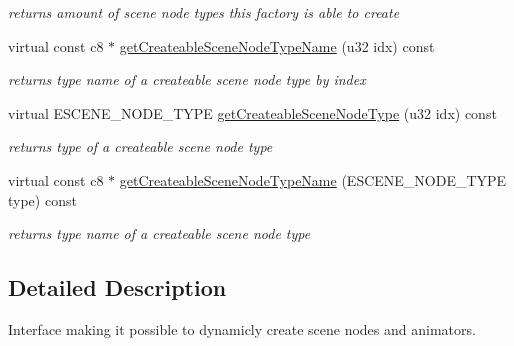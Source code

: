 \begin{DoxyCompactItemize}
\begin{DoxyCompactList}\small\item\em returns amount of scene node types this factory is able to create \end{DoxyCompactList}\item 
virtual const c8 $\ast$ \hyperlink{classirr_1_1scene_1_1_c_default_scene_node_factory_a9144ef2a16534e9aee379e9ccdec3c77}{get\-Createable\-Scene\-Node\-Type\-Name} (u32 idx) const 
\begin{DoxyCompactList}\small\item\em returns type name of a createable scene node type by index \end{DoxyCompactList}\item 
virtual E\-S\-C\-E\-N\-E\-\_\-\-N\-O\-D\-E\-\_\-\-T\-Y\-P\-E \hyperlink{classirr_1_1scene_1_1_c_default_scene_node_factory_a3d3124d454b1b13e3393a1b38b5dc477}{get\-Createable\-Scene\-Node\-Type} (u32 idx) const 
\begin{DoxyCompactList}\small\item\em returns type of a createable scene node type \end{DoxyCompactList}\item 
virtual const c8 $\ast$ \hyperlink{classirr_1_1scene_1_1_c_default_scene_node_factory_ae294bf00e7c5b74da2b69fdd205dfdbe}{get\-Createable\-Scene\-Node\-Type\-Name} (E\-S\-C\-E\-N\-E\-\_\-\-N\-O\-D\-E\-\_\-\-T\-Y\-P\-E type) const 
\begin{DoxyCompactList}\small\item\em returns type name of a createable scene node type \end{DoxyCompactList}\end{DoxyCompactItemize}


\subsection{Detailed Description}
Interface making it possible to dynamicly create scene nodes and animators. 

